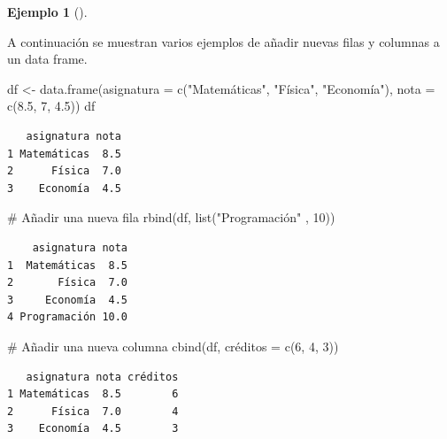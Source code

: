\documentclass[
  a4paper,
]{scrreport}
\newenvironment{Shaded}{\begin{snugshade}}{\end{snugshade}}
\newcommand{\AttributeTok}[1]{\textcolor[rgb]{0.40,0.45,0.13}{#1}}
\newcommand{\CommentTok}[1]{\textcolor[rgb]{0.37,0.37,0.37}{#1}}
\newcommand{\DecValTok}[1]{\textcolor[rgb]{0.68,0.00,0.00}{#1}}
\newcommand{\FloatTok}[1]{\textcolor[rgb]{0.68,0.00,0.00}{#1}}
\newcommand{\FunctionTok}[1]{\textcolor[rgb]{0.28,0.35,0.67}{#1}}
\newcommand{\NormalTok}[1]{\textcolor[rgb]{0.00,0.23,0.31}{#1}}
\newcommand{\OtherTok}[1]{\textcolor[rgb]{0.00,0.23,0.31}{#1}}
\newcommand{\StringTok}[1]{\textcolor[rgb]{0.13,0.47,0.30}{#1}}
\theoremstyle{definition}
\newtheorem{example}{Ejemplo}[chapter]
\theoremstyle{definition}
\theoremstyle{remark}
\begin{document}
\leavevmode{}%
\begin{example}[]\label{exm-añadir-filas-columnas-data-frame}

A continuación se muestran varios ejemplos de añadir nuevas filas y
columnas a un data frame.

\begin{Shaded}
\begin{Highlighting}[]
\NormalTok{df }\OtherTok{\textless{}{-}} \FunctionTok{data.frame}\NormalTok{(}\AttributeTok{asignatura =} \FunctionTok{c}\NormalTok{(}\StringTok{"Matemáticas"}\NormalTok{, }\StringTok{"Física"}\NormalTok{, }\StringTok{"Economía"}\NormalTok{), }\AttributeTok{nota =} \FunctionTok{c}\NormalTok{(}\FloatTok{8.5}\NormalTok{, }\DecValTok{7}\NormalTok{, }\FloatTok{4.5}\NormalTok{))}
\NormalTok{df}
\end{Highlighting}
\end{Shaded}

\begin{verbatim}
   asignatura nota
1 Matemáticas  8.5
2      Física  7.0
3    Economía  4.5
\end{verbatim}

\begin{Shaded}
\begin{Highlighting}[]
\CommentTok{\# Añadir una nueva fila}
\FunctionTok{rbind}\NormalTok{(df, }\FunctionTok{list}\NormalTok{(}\StringTok{"Programación"}\NormalTok{ , }\DecValTok{10}\NormalTok{))}
\end{Highlighting}
\end{Shaded}

\begin{verbatim}
    asignatura nota
1  Matemáticas  8.5
2       Física  7.0
3     Economía  4.5
4 Programación 10.0
\end{verbatim}

\begin{Shaded}
\begin{Highlighting}[]
\CommentTok{\# Añadir una nueva columna}
\FunctionTok{cbind}\NormalTok{(df, créditos }\OtherTok{=} \FunctionTok{c}\NormalTok{(}\DecValTok{6}\NormalTok{, }\DecValTok{4}\NormalTok{, }\DecValTok{3}\NormalTok{))}
\end{Highlighting}
\end{Shaded}

\begin{verbatim}
   asignatura nota créditos
1 Matemáticas  8.5        6
2      Física  7.0        4
3    Economía  4.5        3
\end{verbatim}

\end{example}
\end{document}
